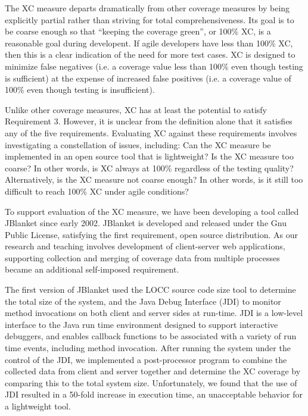 \documentclass[10pt,twocolumn]{article}
\begin{document}
The XC measure departs dramatically from other coverage measures by being
explicitly partial rather than striving for total comprehensiveness.  Its
goal is to be coarse enough so that ``keeping the coverage green'', or
100\% XC, is a reasonable goal during developent. If agile developers have
less than 100\% XC, then this is a clear indication of the need for more
test cases.  XC is designed to minimize false negatives (i.e. a coverage
value less than 100\% even though testing is sufficient) at the expense of
increased false positives (i.e. a coverage value of 100\% even though
testing is insufficient).

Unlike other coverage measures, XC has at least the potential to satisfy
Requirement 3.  However, it is unclear from the definition alone that it
satisfies any of the five requirements. Evaluating XC against these
requirements involves investigating a constellation of issues, including:
Can the XC measure be implemented in an open source tool that is
lightweight?  Is the XC measure too coarse? In other words, is XC always at
100\% regardless of the testing quality?  Alternatively, is the XC measure
not coarse enough?  In other words, is it still too difficult to reach
100\% XC under agile conditions?

\label{sec:JBlanket}

To support evaluation of the XC measure, we have been developing a tool
called JBlanket since early 2002. JBlanket is developed and released under the
Gnu Public License, satisfying the first requirement, open source
distribution. As our research and teaching involves development of
client-server web applications, supporting collection and merging of
coverage data from multiple processes became an additional self-imposed
requirement.

The first version of JBlanket used the LOCC source code size tool  to
determine the total size of the system, and the Java Debug Interface (JDI)
to monitor method invocations on both client and server sides at
run-time. JDI is a low-level interface to the Java run time environment
designed to support interactive debuggers, and enables callback functions
to be associated with a variety of run time events, including method
invocation. After running the system under the control of the JDI, we
implemented a post-processor program to combine the collected data from
client and server together and determine the XC coverage by comparing this
to the total system size.  Unfortunately, we found that the use of JDI
resulted in a 50-fold increase in execution time, an unacceptable behavior
for a lightweight tool.
\end{document}
